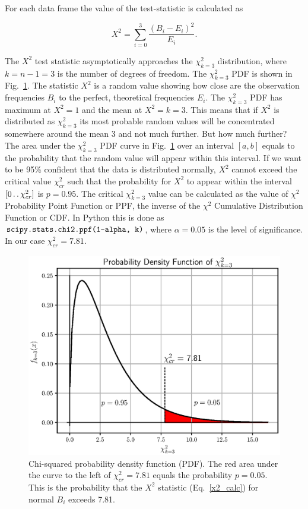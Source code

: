 \documentclass[letterpaper,twoside,12pt]{article}
\newcommand{\twodots}{\mathinner {\ldotp \ldotp}}
\begin{document}
For each data frame the value of the test-statistic is calculated as

\begin{equation}
  \label{x2_calc}
  X^2 = \sum_{i=0}^3 \frac{(B_i - E_i)^2}{E_i}.
\end{equation}


The $X^2$ test statistic asymptotically approaches the $\chi^2_{k=3}$ distribution, where $k = n - 1 = 3$ is the number of degrees of freedom. The $\chi^2_{k=3}$ PDF is shown in Fig.~\ref{chi2_pdf}. The statistic $X^2$ is a random value showing how close are the observation frequencies $B_i$ to the perfect, theoretical frequencies $E_i$. The $\chi^2_{k=3}$ PDF has maximum at $X^2=1$ and the mean at $X^2=k=3$. This means that if $X^2$ is distributed as $\chi^2_{k=3}$ its most probable random values will be concentrated somewhere around the mean 3 and not much further. But how much further? The area under the $\chi^2_{k=3}$ PDF curve in Fig.~\ref{chi2_pdf} over an interval $[a,b]$ equals to the probability that the random value will appear within this interval. If we want to be 95\% confident that the data is distributed normally, $X^2$ cannot exceed the critical value $\chi^2_{cr}$ such that the probability for $X^2$ to appear within the interval $[0 \twodots \chi^2_{cr}]$ is $p=0.95$. The critical $\chi^2_{k=3}$ value can be calculated as the value of $\chi^2$ Probability Point Function or PPF, the inverse of the $\chi^2$ Cumulative Distribution Function or CDF. In Python this is done as $\verb@scipy.stats.chi2.ppf(1-alpha, k)@$, where $\alpha = 0.05$ is the level of significance. In our case $\chi^2_{cr} = 7.81$. 

\begin{figure}[ht!]
  \begin{center}
  \includegraphics[width=30pc]{fig_chi2_pdf.eps}
  \caption{\small Chi-squared probability density function (PDF). The red area under the curve to the left of $\chi^2_{cr} = 7.81$ equals the probability $p=0.05$. This is the probability that the $X^2$ statistic (Eq.~\eqref{x2_calc}) for normal $B_i$ exceeds 7.81.}
  \label{chi2_pdf}
  \end{center}
\end{figure}
\end{document}

